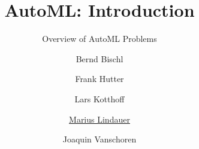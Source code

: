 




\title[AutoML: Problems]{AutoML: Introduction}
\subtitle{Overview of AutoML Problems}
\author[Marius Lindauer]{Bernd Bischl \and Frank Hutter \and Lars Kotthoff\newline \and \underline{Marius Lindauer} \and Joaquin Vanschoren}
\institute{}
\date{}





	
	\maketitle
	


